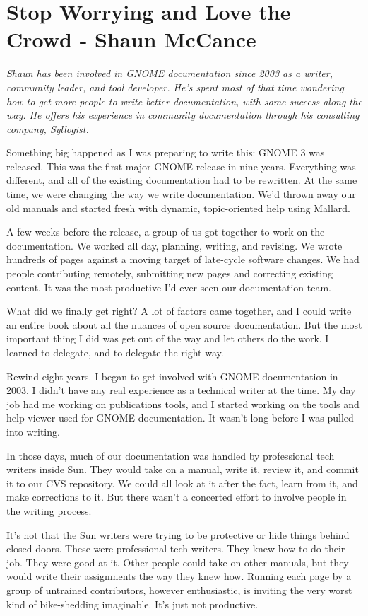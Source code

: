 \chapter{Stop Worrying and Love the Crowd - Shaun McCance}

\textit{Shaun has been involved in GNOME documentation since 2003
as a writer, community leader, and tool developer. He's spent
most of that time wondering how to get more people to write better
documentation, with some success along the way. He offers his
experience in community documentation through his consulting
company, Syllogist.}

Something big happened as I was preparing to write this: GNOME 3 was released.
This was the first major GNOME release in nine years. Everything was different,
and all of the existing documentation had to be rewritten. At the same time, we
were changing the way we write documentation. We'd thrown away our old manuals
and started fresh with dynamic, topic-oriented help using Mallard.

A few weeks before the release, a group of us got together to work on the
documentation. We worked all day, planning, writing, and revising. We wrote
hundreds of pages against a moving target of late-cycle software changes. We
had people contributing remotely, submitting new pages and correcting existing
content. It was the most productive I'd ever seen our documentation team.

What did we finally get right? A lot of factors came together, and I could
write an entire book about all the nuances of open source documentation.
But the most important thing I did was get out of the way and let others
do the work. I learned to delegate, and to delegate the right way.

Rewind eight years. I began to get involved with GNOME documentation in 2003.
I didn't have any real experience as a technical writer at the time. My day
job had me working on publications tools, and I started working on the tools
and help viewer used for GNOME documentation. It wasn't long before I was
pulled into writing.

In those days, much of our documentation was handled by professional tech
writers inside Sun. They would take on a manual, write it, review it, and
commit it to our CVS repository. We could all look at it after the fact,
learn from it, and make corrections to it. But there wasn't a concerted
effort to involve people in the writing process.

It's not that the Sun writers were trying to be protective or hide things
behind closed doors. These were professional tech writers. They knew how
to do their job. They were good at it. Other people could take on other
manuals, but they would write their assignments the way they knew how.
Running each page by a group of untrained contributors, however
enthusiastic, is inviting the very worst kind of bike-shedding
imaginable. It's just not productive.

